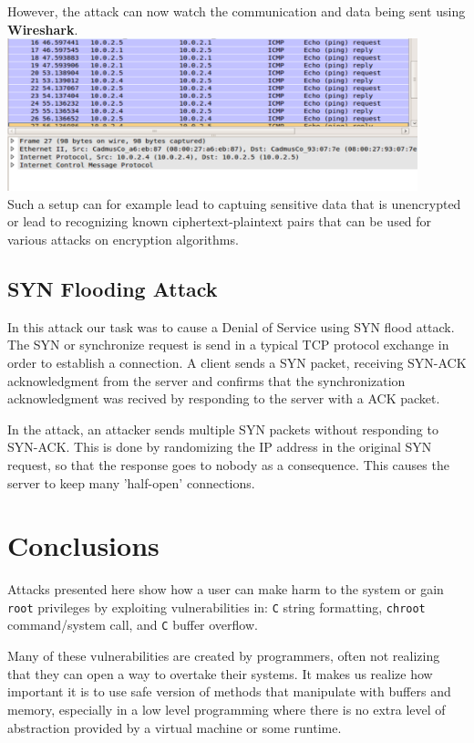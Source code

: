 \documentclass[12pt, a4paper, pdflatex]{article}
\begin{document}
However, the attack can now watch the communication and data being sent using \textbf{Wireshark}.\\

\includegraphics[width=450px]{gfx/imcp-shark}\\

Such a setup can for example lead to captuing sensitive data that is unencrypted or lead to recognizing known ciphertext-plaintext pairs that can be used for various attacks on encryption algorithms.




\subsection{SYN Flooding Attack}

In this attack our task was to cause a Denial of Service using SYN flood attack. The SYN or synchronize request is send in a typical TCP protocol exchange in order to establish a connection. A client sends a SYN packet, receiving SYN-ACK acknowledgment from the server and confirms that the synchronization acknowledgment was recived by responding to the server with a ACK packet.

In the attack, an attacker sends multiple SYN packets without responding to SYN-ACK. This is done by randomizing the IP address in the original SYN request, so that the response goes to nobody as a consequence. This causes the server to keep many 'half-open' connections.




\section{Conclusions}
Attacks presented here show how a user can make harm to the system or gain \texttt{root} privileges by exploiting vulnerabilities in: \texttt{C} string formatting, \texttt{chroot} command/system call, and \texttt{C} buffer overflow.

Many of these vulnerabilities are created by programmers, often not realizing that they can open a way to overtake their systems. It makes us realize how important it is to use safe version of methods that manipulate with buffers and memory, especially in a low level programming where there is no extra level of abstraction provided by a virtual machine or some runtime.
\end{document}
